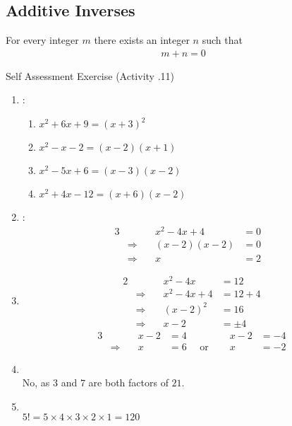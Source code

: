 \documentclass[../notes.tex]{subfiles}
\begin{document}
			\subsection{Additive Inverses}
				For every integer $m$ there exists an integer $n$ such that
				\nopagebreak
				\begin{align*}
					m + n = 0
				\end{align*}
			\pagebreak
			\begin{exercise}{Self Assessment Exercise (Activity \thechapter.11)}
				\begin{enumerate}
					\item {}:
						\begin{enumerate}[label=(\alph*)]
							\item $ x^{2} + 6x + 9 = (x + 3)^{2} $
							\item $ x^{2} - x - 2 = (x - 2)(x + 1) $
							\item $ x^{2} - 5x + 6 = (x - 3)(x - 2) $
							\item $ x^{2} + 4x - 12 = (x + 6)(x - 2) $
						\end{enumerate}
					\item {}:
						\begin{alignat*}{3}
							& \qquad & x^{2} - 4x + 4 &= 0\\
							& \Rightarrow \quad & (x - 2)(x - 2) &= 0\\
							& \Rightarrow \quad &x &= 2 &
						\end{alignat*}
					\item {}
						\begin{alignat*}{2}
							& \qquad &x^{2} - 4x &= 12\\
							& \Rightarrow \quad &x^{2} - 4x + 4 &= 12 + 4\\
							& \Rightarrow \quad &(x - 2)^{2} &= 16\\
							& \Rightarrow \quad & x - 2 &= \pm 4
						\end{alignat*}
						\begin{alignat*}{3}
							& \qquad &x - 2 &= 4 \qquad &x - 2 &= -4\\
							& \Rightarrow \quad &x &= 6 \quad \text{ or } \quad &x &= -2 
						\end{alignat*}
					\item {}\\
						No, as $3$ and $7$ are both factors of $21$.
					\item {}\\
						$5! = 5 \times 4 \times 3 \times 2 \times 1 = 120$
				\end{enumerate}
			\end{exercise}
\end{document}
